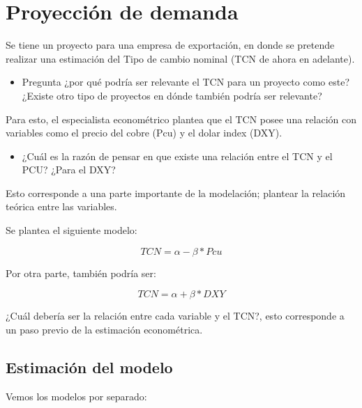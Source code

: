 \documentclass[
  letterpaper,
  DIV=11,
  numbers=noendperiod]{scrartcl}
\providecommand{\tightlist}{%
  \setlength{\itemsep}{0pt}\setlength{\parskip}{0pt}}\usepackage{longtable,booktabs,array}
\begin{document}
\section{Proyección de demanda}\label{proyecciuxf3n-de-demanda}

Se tiene un proyecto para una empresa de exportación, en donde se
pretende realizar una estimación del Tipo de cambio nominal (TCN de
ahora en adelante).

\begin{itemize}
\tightlist
\item
  Pregunta ¿por qué podría ser relevante el TCN para un proyecto como
  este? ¿Existe otro tipo de proyectos en dónde también podría ser
  relevante?
\end{itemize}

Para esto, el especialista econométrico plantea que el TCN posee una
relación con variables como el precio del cobre (Pcu) y el dolar index
(DXY).

\begin{itemize}
\tightlist
\item
  ¿Cuál es la razón de pensar en que existe una relación entre el TCN y
  el PCU? ¿Para el DXY?
\end{itemize}

Esto corresponde a una parte importante de la modelación; plantear la
relación teórica entre las variables.

Se plantea el siguiente modelo:

\begin{equation}
TCN = \alpha - \beta * Pcu
\end{equation}

Por otra parte, también podría ser:

\begin{equation}
TCN = \alpha + \beta * DXY
\end{equation}

¿Cuál debería ser la relación entre cada variable y el TCN?, esto
corresponde a un paso previo de la estimación econométrica.

\subsection{Estimación del modelo}\label{estimaciuxf3n-del-modelo}

Vemos los modelos por separado:
\end{document}
